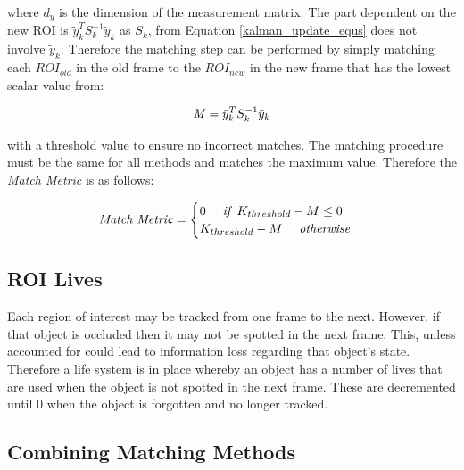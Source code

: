 \documentclass[a4paper,11pt,notitlepage]{article}
\begin{document}
where $d_{y}$ is the dimension of the measurement matrix. The part dependent on the new ROI is $\tilde{y}_{k}^{T}S_{k}^{-1}\tilde{y}_{k}$ as $S_{k}$, from Equation \ref{kalman_update_equs} does not involve $\tilde{y}_{k}$. Therefore the matching step can be performed by simply matching each $ROI_{old}$ in the old frame to the $ROI_{new}$ in the new frame that has the lowest scalar value from:

\begin{equation}
\begin{aligned}
\textnormal{\textit{M}} = \tilde{y}_{k}^{T}S_{k}^{-1}\tilde{y}_{k}
\end{aligned}
\end{equation}

with a threshold value to ensure no incorrect matches. The matching procedure must be the same for all methods and matches the maximum value. Therefore the \textit{Match Metric} is as follows:

\begin{equation}
\begin{aligned}
\textnormal{\textit{Match Metric}} = 
\begin{cases}
0 \quad \textnormal{\textit{ if }} K_{threshold}-M \leq 0 \\
K_{threshold}-M \quad \textnormal{\textit{ otherwise}}
\end{cases}
\end{aligned}
\end{equation}


\subsection{ROI Lives}
Each region of interest may be tracked from one frame to the next. However, if that object is occluded then it may not be spotted in the next frame. This, unless accounted for could lead to information loss regarding that object's state. Therefore a life system is in place whereby an object has a number of lives that are used when the object is not spotted in the next frame. These are decremented until 0 when the object is forgotten and no longer tracked.  

\subsection{Combining Matching Methods} \label{matching_combining_methods}
\end{document}
